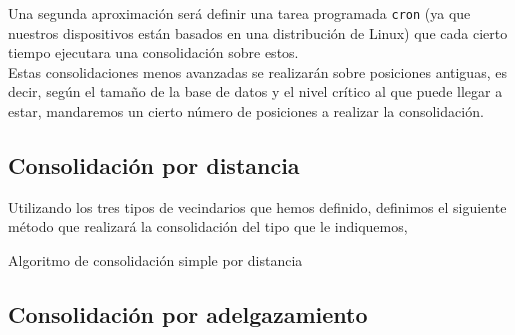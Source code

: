 \documentclass[a4paper, 12pt]{article}
\begin{document}
Una segunda aproximaci\'on ser\'a definir una tarea programada \texttt{cron} (ya que nuestros dispositivos est\'an basados en una distribuci\'on de Linux) que cada cierto tiempo ejecutara una consolidaci\'on sobre estos. \\

Estas consolidaciones menos avanzadas se realizar\'an sobre posiciones antiguas, es decir, seg\'un el tama\~no de la base de datos y el nivel cr\'itico al que puede llegar a estar, mandaremos un cierto n\'umero de posiciones a realizar la consolidaci\'on. \\

\pagebreak

\subsection{Consolidaci\'on por distancia}

Utilizando los tres tipos de vecindarios que hemos definido, definimos el siguiente m\'etodo que realizar\'a la consolidaci\'on del tipo que le indiquemos, \\

\pagebreak

\begin{algorithm}[h]\label{consolidationByDistance}
\begin{algorithmic}[1]
        \Else
        \EndIf
    \EndIf
        \Else
        \EndIf
    \EndIf
        \Else
        \EndIf
    \EndIf
\EndFor
\EndFunction
\end{algorithmic}
\caption{\label{alg:consolidationByDinstace} Algoritmo de consolidaci\'on simple por distancia}
\end{algorithm}


\subsection{Consolidaci\'on por adelgazamiento}
\end{document}
